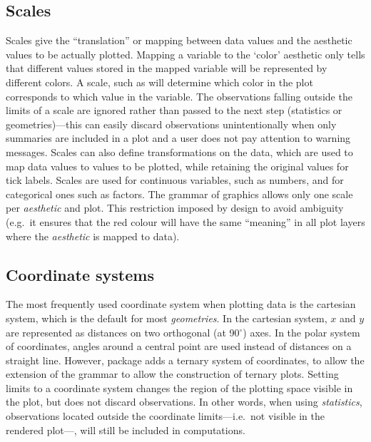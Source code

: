 \documentclass[krantz2]{krantz}\usepackage{knitr}%
\begin{document}
\subsection{Scales}

Scales give the ``translation'' or mapping between data values and the aesthetic values to be actually plotted. Mapping a variable to the `color' aesthetic only tells that different values stored in the mapped variable will be represented by different colors. A scale, such as  will determine which color in the plot corresponds to which value in the variable. The observations falling outside the limits of a scale are ignored rather than passed to the next step (statistics or geometries)---this can easily discard observations unintentionally when only summaries are included in a plot and a user does not pay attention to warning messages. Scales can also define transformations on the data, which are used to map data values to values to be plotted, while retaining the original values for tick labels.  Scales are used for continuous variables, such as numbers, and for categorical ones such as factors. The grammar of graphics allows only one scale per \emph{aesthetic} and plot. This restriction imposed by design to avoid ambiguity (e.g.\ it ensures that the red colour will have the same ``meaning'' in all plot layers where the  \emph{aesthetic} is mapped to data).

\subsection{Coordinate systems}

The most frequently used coordinate system when plotting data is the cartesian system, which is the default for most \emph{geometries}. In the cartesian system, $x$ and $y$ are represented as distances on two orthogonal (at 90$^\circ$) axes. In the polar system of coordinates, angles around a central point are used instead of distances on a straight line. However, package  adds a ternary system of coordinates, to allow the extension of the grammar to allow the construction of ternary plots. Setting limits to a coordinate system changes the region of the plotting space visible in the plot, but does not discard observations. In other words, when using \emph{statistics}, observations located outside the coordinate limits---i.e.\ not visible in the rendered plot---, will still be included in computations.
\end{document}
